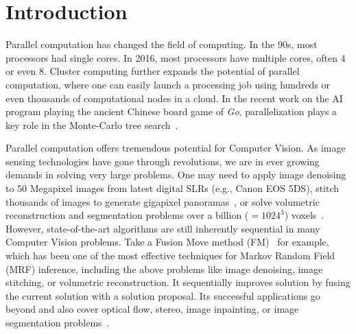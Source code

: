 \section{Introduction}

Parallel computation has changed the field of computing.  In the 90s,
most processors had single cores. In 2016, most processors have multiple
cores, often 4 or even 8. Cluster computing further expands the
potential of parallel computation, where one can easily launch a
processing job using hundreds or even thousands of computational nodes
in a cloud.
%
In the recent work on the AI program playing the ancient Chinese board
game of {\it Go}, parallelization plays a key role in the Monte-Carlo
tree search~\cite{nature_alpha_go}.


Parallel computation offers tremendous potential for Computer Vision. As
image sensing technologies have gone through revolutions, we are in
ever growing demands in solving very large problems. One may need to
apply image denoising to 50 Megapixel images from latest digital
SLRs (e.g., Canon EOS 5DS), stitch thousands of images to generate gigapixel
panoramas~\cite{gigapan}, or solve volumetric reconstruction and
segmentation problems over a billion ($=1024^3$)
voxels~\cite{Joint3DSceneReconstructionandclassSegmentation}.
%
%
However, state-of-the-art algorithms are still inherently sequential in
many Computer Vision problems. Take a Fusion Move method
(FM)~\cite{fusion_flow,fusion_moves_for_markov_random_field_optimization,second_order_stereo} for example, which has been
one of the most effective techniques for Markov Random Field (MRF)
inference, including the above problems like image denoising, image
stitching, or volumetric reconstruction.
%
It sequentially improves solution by fusing the current solution with a
solution proposal. Its successful applications go beyond and also cover
optical flow, stereo, image inpainting, or image segmentation
problems~\cite{fusion_moves_for_markov_random_field_optimization}.


